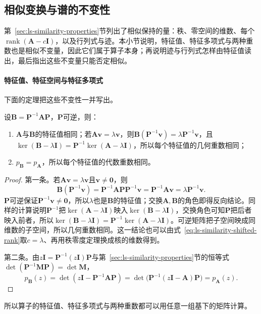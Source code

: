 \subsection{相似变换与谱的不变性}
\label{sec:ls-eigen-similarity-invariance}

第~\ref{sec:ls-similarity-properties}节列出了相似保持的量：秩、零空间的维数、每个$\operatorname{rank}(\bm A-c\bm I)$，以及行列式与迹。本小节说明，特征值、特征多项式与两种重数也是相似不变量，因此它们属于算子本身；再说明迹与行列式怎样由特征值读出，最后指出这些不变量只能否定相似。

\paragraph{特征值、特征空间与特征多项式}
下面的定理把这些不变性一并写出。

\begin{theorem}[谱的相似不变性]
\label{thm:ls-spectrum-similarity-invariance}
设$\bm B=\bm P^{-1}\bm A\bm P$，$\bm P$可逆，则：
\begin{enumerate}
 \item $\bm A$与$\bm B$的特征值相同；若$\bm A\bm v=\lambda\bm v$，则$\bm B(\bm P^{-1}\bm v)=\lambda\bm P^{-1}\bm v$，且$\ker(\bm B-\lambda\bm I)=\bm P^{-1}\ker(\bm A-\lambda\bm I)$，所以每个特征值的几何重数相同；
 \item $p_{\bm B}=p_{\bm A}$，所以每个特征值的代数重数相同。
\end{enumerate}
\end{theorem}
\begin{proof}
第一条。若$\bm A\bm v=\lambda\bm v$且$\bm v\neq\bm0$，则
\[
 \bm B(\bm P^{-1}\bm v)=\bm P^{-1}\bm A\bm P\bm P^{-1}\bm v=\bm P^{-1}\bm A\bm v=\lambda\bm P^{-1}\bm v .
\]
$\bm P$可逆保证$\bm P^{-1}\bm v\neq\bm0$，所以$\lambda$也是$\bm B$的特征值；交换$\bm A,\bm B$的角色即得反向结论。同样的计算说明$\bm P^{-1}$把$\ker(\bm A-\lambda\bm I)$映入$\ker(\bm B-\lambda\bm I)$，交换角色可知$\bm P$把后者映入前者，所以$\ker(\bm B-\lambda\bm I)=\bm P^{-1}\ker(\bm A-\lambda\bm I)$。可逆矩阵把子空间映成同维数的子空间，所以几何重数相同。这一结论也可以由式~\eqref{eq:ls-similarity-shifted-rank}取$c=\lambda$、再用秩零度定理换成核的维数得到。

第二条。由$z\bm I=\bm P^{-1}(z\bm I)\bm P$与第~\ref{sec:ls-similarity-properties}节的恒等式$\det(\bm P^{-1}\bm M\bm P)=\det\bm M$，
\[
 p_{\bm B}(z)=\det(z\bm I-\bm P^{-1}\bm A\bm P)=\det\bigl(\bm P^{-1}(z\bm I-\bm A)\bm P\bigr)=p_{\bm A}(z).
\]
\end{proof}
所以算子的特征值、特征多项式与两种重数都可以用任意一组基下的矩阵计算。

